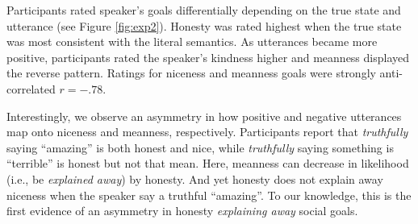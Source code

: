 \documentclass[10pt,letterpaper]{article}
\begin{document}

Participants rated speaker's goals differentially depending on the true state and utterance (see Figure \ref{fig:exp2}).
Honesty was rated highest when the true state was most consistent with the literal semantics. 
As utterances became more positive, participants rated the speaker's kindness higher and meanness displayed the reverse pattern. 
Ratings for niceness and meanness goals were strongly anti-correlated $r = -.78$.

Interestingly, we observe an asymmetry in how positive and negative utterances map onto niceness and meanness, respectively. 
Participants report that \emph{truthfully} saying ``amazing'' is both honest and nice, while \emph{truthfully} saying something is ``terrible'' is honest but not that mean.
Here, meanness can decrease in likelihood (i.e., be \emph{explained away}) by honesty.
And yet honesty does not explain away niceness when the speaker say a truthful ``amazing''. 
To our knowledge, this is the first evidence of an asymmetry in honesty \emph{explaining away} social goals.
\end{document}
